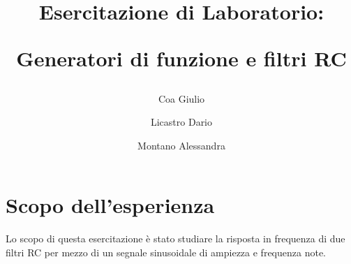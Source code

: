 \documentclass{article}
\title{
		\begin{center}
			Esercitazione di Laboratorio:
		\end{center}
		\newline
		\begin{center}
			Generatori di funzione e filtri RC
		\end{center}
	}
\author{
			Coa Giulio
			\and
			Licastro Dario
			\and
			Montano Alessandra
		}
\begin{document}
	\begin{titlingpage}
		\maketitle
	\end{titlingpage}
	\newpage
	\section{Scopo dell'esperienza}
		Lo scopo di questa esercitazione è stato studiare la risposta in frequenza di due filtri RC per mezzo di un segnale sinusoidale di ampiezza e frequenza note.
\end{document}
